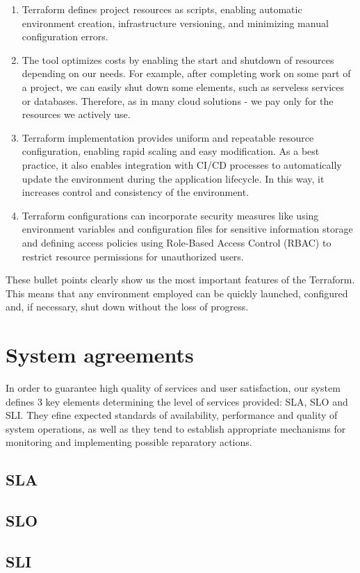 \documentclass{article}
\begin{document}
\begin{enumerate}
    \item Terraform defines project resources as scripts, enabling automatic environment creation, infrastructure versioning, and minimizing manual configuration errors.
    \item The tool optimizes costs by enabling the start and shutdown of resources depending on our needs. For example, after completing work on some part of a project, we can easily shut down some elements, such as serveless services or databases. Therefore, as in many cloud solutions - we pay only for the resources we actively use. 
    \item Terraform implementation provides uniform and repeatable resource configuration, enabling rapid scaling and easy modification. As a best practice, it also enables integration with CI/CD processes to automatically update the environment during the application lifecycle. In this way, it increases control and consistency of the environment.
    \item Terraform configurations can incorporate security measures like using environment variables and configuration files for sensitive information storage and defining access policies using Role-Based Access Control (RBAC) to restrict resource permissions for unauthorized users.
\end{enumerate}

These bullet points clearly show us the most important features of the Terraform. This means that any environment employed can be quickly launched, configured and, if necessary, shut down without the loss of progress.  

\section{System agreements}

In order to guarantee high quality of services and user satisfaction, our system defines 3 key elements determining the level of services provided: SLA, SLO and SLI. They efine expected standards of availability, performance and quality of system operations, as well as they tend to establish appropriate mechanisms for monitoring and implementing possible reparatory actions.

\subsection{SLA}





\subsection{SLO}
\subsection{SLI}


 

\appendix
\end{document}
